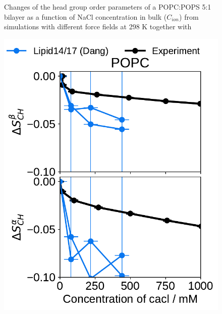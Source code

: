 \begin{figure}[htb!]
  \caption{\label{fig:delta_ordPar_NaCl} 
    Changes of the head group order parameters of a POPC:POPS 5:1 bilayer as a function of NaCl concentration 
    in bulk ($C_{ion}$) from simulations with different force fields at 298 K together with  
  } 
\end{figure} 


\begin{figure}[htb!] 
  \centering 
  \includegraphics[width=\figwidth]{../img/ecc_pops/l17/order_parameters_changes_A-B_POPC_cacl.pdf} 

\end{figure}

